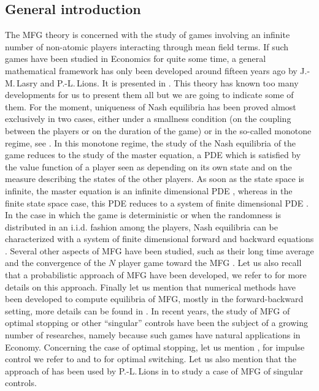 \documentclass[10pt]{amsart}
\theoremstyle{definition}
\begin{document}
\subsection*{General introduction}
The MFG theory is concerned with the study of games involving an infinite number of non-atomic players interacting through mean field terms. If such games have been studied in Economics for quite some time, a general mathematical framework has only been developed around fifteen years ago by J.\nobreakdash-M.\,Lasry and P.-L.\,Lions. It is presented in \cite{lasry2007mean,lions2007cours}. This theory has known too many developments for us to present them all but we are going to indicate some of them. For the moment, uniqueness of Nash equilibria has been proved almost exclusively in two cases, either under a smallness condition (on the coupling between the players or on the duration of the game) or in the so-called monotone regime, see \cite{lasry2007mean,lions2007cours,porretta2015weak}. In this monotone regime, the study of the Nash equilibria of the game reduces to the study of the master equation, a PDE which is satisfied by the value function of a player seen as depending on its own state and on the measure describing the states of the other players. As soon as the state space is infinite, the master equation is an infinite dimensional PDE \cite{cardaliaguet2019master}, whereas in the finite state space case, this PDE reduces to a system of finite dimensional PDE \cite{lions2007cours,bayraktarcohen,cecchinpelino}. In the case in which the game is deterministic or when the randomness is distributed in an i.i.d. fashion among the players, Nash equilibria can be characterized with a system of finite dimensional forward and backward equations \cite{lasry2007mean,cardaliaguet2019master}. Several other aspects of MFG have been studied, such as their long time average \cite{cardaliaguet2019long,cardaliaguet2012long} and the convergence of the $N$ player game toward the MFG \cite{cardaliaguet2019master,lacker2018convergence,cecchinpelino}. Let us also recall that a probabilistic approach of MFG have been developed, we refer to \cite{carmona2018probabilistic,lacker2016general} for more details on this approach. Finally let us mention that numerical methods have been developed to compute equilibria of MFG, mostly in the forward-backward setting, more details can be found in \cite{achdou2010mean,achdou2020mean,briceno2019implementation}.
In recent years, the study of MFG of optimal stopping or other ``singular'' controls have been the subject of a growing number of researches, namely because such games have natural applications in Economy. Concerning the case of optimal stopping, let us mention \cite{bertucci2018optimal, carmona2016mean,nutz2016mean,nutz2020convergence}, for impulse control we refer to \cite{bertucci2020fokker} and to \cite{gomes2016weakly} for optimal switching. Let us also mention that the approach of \cite{bertucci2018optimal,bertucci2020fokker} has been used by P.-L.\,Lions in \cite{lions2018cours} to study a case of MFG of singular controls.
\end{document}
